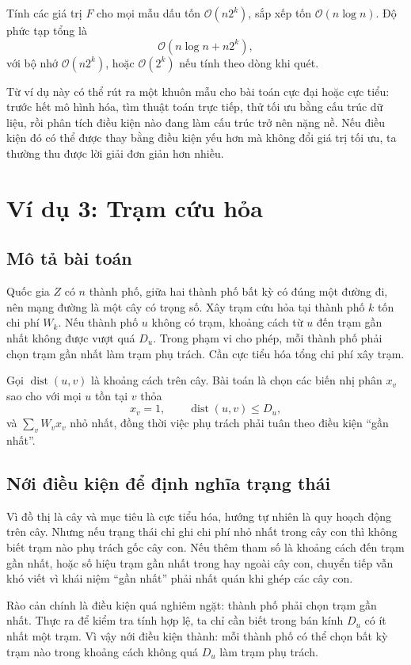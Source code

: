 \documentclass[11pt]{article}
\newcommand{\Oh}{\mathcal{O}}
\begin{document}
Tính các giá trị \(F\) cho mọi mẫu dấu tốn \(\Oh(n2^k)\), sắp xếp tốn
\(\Oh(n\log n)\). Độ phức tạp tổng là
\[
  \Oh(n\log n+n2^k),
\]
với bộ nhớ \(\Oh(n2^k)\), hoặc \(\Oh(2^k)\) nếu tính theo dòng khi quét.

Từ ví dụ này có thể rút ra một khuôn mẫu cho bài toán cực đại hoặc cực tiểu:
trước hết mô hình hóa, tìm thuật toán trực tiếp, thử tối ưu bằng cấu trúc dữ
liệu, rồi phân tích điều kiện nào đang làm cấu trúc trở nên nặng nề. Nếu điều
kiện đó có thể được thay bằng điều kiện yếu hơn mà không đổi giá trị tối ưu,
ta thường thu được lời giải đơn giản hơn nhiều.

\section{Ví dụ 3: Trạm cứu hỏa}

\subsection{Mô tả bài toán}

Quốc gia \(Z\) có \(n\) thành phố, giữa hai thành phố bất kỳ có đúng một đường
đi, nên mạng đường là một cây có trọng số. Xây trạm cứu hỏa tại thành phố
\(k\) tốn chi phí \(W_k\). Nếu thành phố \(u\) không có trạm, khoảng cách từ
\(u\) đến trạm gần nhất không được vượt quá \(D_u\). Trong phạm vi cho phép,
mỗi thành phố phải chọn trạm gần nhất làm trạm phụ trách. Cần cực tiểu hóa
tổng chi phí xây trạm.

Gọi \(\operatorname{dist}(u,v)\) là khoảng cách trên cây. Bài toán là chọn các
biến nhị phân \(x_v\) sao cho với mọi \(u\) tồn tại \(v\) thỏa
\[
  x_v=1,\qquad \operatorname{dist}(u,v)\le D_u,
\]
và \(\sum_v W_vx_v\) nhỏ nhất, đồng thời việc phụ trách phải tuân theo điều
kiện ``gần nhất''.

\subsection{Nới điều kiện để định nghĩa trạng thái}

Vì đồ thị là cây và mục tiêu là cực tiểu hóa, hướng tự nhiên là quy hoạch động
trên cây. Nhưng nếu trạng thái chỉ ghi chi phí nhỏ nhất trong cây con thì
không biết trạm nào phụ trách gốc cây con. Nếu thêm tham số là khoảng cách đến
trạm gần nhất, hoặc số hiệu trạm gần nhất trong hay ngoài cây con, chuyển tiếp
vẫn khó viết vì khái niệm ``gần nhất'' phải nhất quán khi ghép các cây con.

Rào cản chính là điều kiện quá nghiêm ngặt: thành phố phải chọn trạm gần nhất.
Thực ra để kiểm tra tính hợp lệ, ta chỉ cần biết trong bán kính \(D_u\) có ít
nhất một trạm. Vì vậy nới điều kiện thành: mỗi thành phố có thể chọn bất kỳ
trạm nào trong khoảng cách không quá \(D_u\) làm trạm phụ trách.
\end{document}
